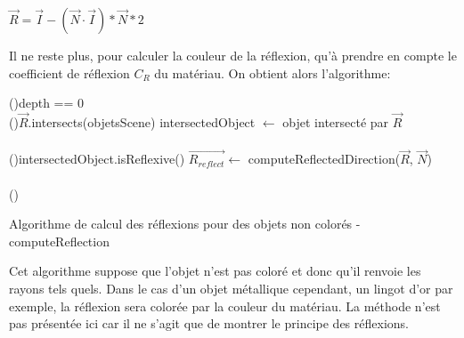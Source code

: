 \documentclass[11pt]{article}
\begin{document}
\begin{center}
	$\overrightarrow{R} = \overrightarrow{I} - (\overrightarrow{N}\cdot \overrightarrow{I})*\overrightarrow{N}*2$
\end{center}

Il ne reste plus, pour calculer la couleur de la réflexion, qu'à prendre en compte le coefficient de réflexion $C_R$ du matériau. On obtient alors l'algorithme:

\begin{algorithm}[H]
	\DontPrintSemicolon

	\If(){depth == 0}
	{
	}
	\hfill\\

	\If(){$\overrightarrow{R}$.intersects(objetsScene)}
	{
		intersectedObject $\gets$ objet intersecté par $\overrightarrow{R}$\\\hfill\\

		\If(){intersectedObject.isReflexive()}
		{
			$\overrightarrow{R_{reflect}} \gets$ computeReflectedDirection($\overrightarrow{R}$, $\overrightarrow{N}$)\\\hfill\\

		}
		\Else()
		{
		}
	}
	\Else
	{
	}

	\caption{Algorithme de calcul des réflexions pour des objets non colorés - computeReflection}
	\label{algoReflections}
\end{algorithm}

Cet algorithme suppose que l'objet n'est pas coloré et donc qu'il renvoie les rayons tels quels. Dans le cas d'un objet métallique cependant, un lingot d'or par exemple, la réflexion sera colorée par la couleur du matériau. La méthode n'est pas présentée ici car il ne s'agit que de montrer le principe des réflexions.
\end{document}
